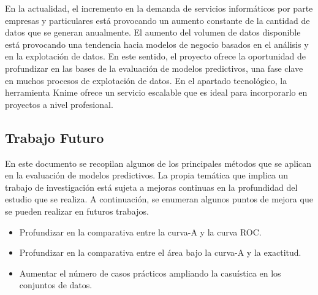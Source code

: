 \bigbreak

En la actualidad, el incremento en la demanda de servicios informáticos por parte empresas y particulares está provocando un aumento constante de la cantidad de datos que se generan anualmente. El aumento del volumen de datos disponible está provocando una tendencia hacia modelos de negocio basados en el análisis y en la explotación de datos. En este sentido, el proyecto ofrece la oportunidad de profundizar en las bases de la evaluación de modelos predictivos, una fase clave en muchos procesos de explotación de datos. En el apartado tecnológico, la herramienta Knime ofrece un servicio escalable que es ideal para incorporarlo en proyectos a nivel profesional.

\subsection{Trabajo Futuro}

En este documento se recopilan algunos de los principales métodos que se aplican en la evaluación de modelos predictivos. La propia temática que implica un trabajo de investigación está sujeta a mejoras continuas en la profundidad del estudio que se realiza. A continuación, se enumeran algunos puntos de mejora que se pueden realizar en futuros trabajos.

\begin{itemize}
    \item Profundizar en la comparativa entre la curva-A y la curva ROC.
    \item Profundizar en la comparativa entre el área bajo la curva-A y la exactitud.
    \item Aumentar el número de casos prácticos ampliando la casuística en los conjuntos de datos.
\end{itemize}

\clearpage